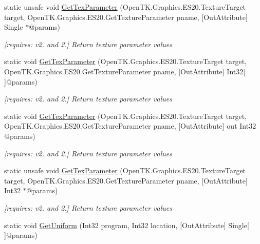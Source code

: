 \begin{DoxyCompactItemize}
static unsafe void \hyperlink{class_open_t_k_1_1_graphics_1_1_e_s20_1_1_g_l_a5606fb0cbe39b61b42330389179db6d7}{Get\-Tex\-Parameter} (Open\-T\-K.\-Graphics.\-E\-S20.\-Texture\-Target target, Open\-T\-K.\-Graphics.\-E\-S20.\-Get\-Texture\-Parameter pname, \mbox{[}Out\-Attribute\mbox{]} Single $\ast$@params)
\begin{DoxyCompactList}\small\item\em \mbox{[}requires\-: v2. and 2.\mbox{]} Return texture parameter values \end{DoxyCompactList}\item 
static void \hyperlink{class_open_t_k_1_1_graphics_1_1_e_s20_1_1_g_l_afcbdca751f2e40ee0025104967a636ea}{Get\-Tex\-Parameter} (Open\-T\-K.\-Graphics.\-E\-S20.\-Texture\-Target target, Open\-T\-K.\-Graphics.\-E\-S20.\-Get\-Texture\-Parameter pname, \mbox{[}Out\-Attribute\mbox{]} Int32\mbox{[}$\,$\mbox{]}@params)
\begin{DoxyCompactList}\small\item\em \mbox{[}requires\-: v2. and 2.\mbox{]} Return texture parameter values \end{DoxyCompactList}\item 
static void \hyperlink{class_open_t_k_1_1_graphics_1_1_e_s20_1_1_g_l_a906a2cf160b49867e188be1975690f97}{Get\-Tex\-Parameter} (Open\-T\-K.\-Graphics.\-E\-S20.\-Texture\-Target target, Open\-T\-K.\-Graphics.\-E\-S20.\-Get\-Texture\-Parameter pname, \mbox{[}Out\-Attribute\mbox{]} out Int32 @params)
\begin{DoxyCompactList}\small\item\em \mbox{[}requires\-: v2. and 2.\mbox{]} Return texture parameter values \end{DoxyCompactList}\item 
static unsafe void \hyperlink{class_open_t_k_1_1_graphics_1_1_e_s20_1_1_g_l_a98cb47383f5dbeb82656b040970ad398}{Get\-Tex\-Parameter} (Open\-T\-K.\-Graphics.\-E\-S20.\-Texture\-Target target, Open\-T\-K.\-Graphics.\-E\-S20.\-Get\-Texture\-Parameter pname, \mbox{[}Out\-Attribute\mbox{]} Int32 $\ast$@params)
\begin{DoxyCompactList}\small\item\em \mbox{[}requires\-: v2. and 2.\mbox{]} Return texture parameter values \end{DoxyCompactList}\item 
static void \hyperlink{class_open_t_k_1_1_graphics_1_1_e_s20_1_1_g_l_a6f70a32f31d8665fcab76056af81f943}{Get\-Uniform} (Int32 program, Int32 location, \mbox{[}Out\-Attribute\mbox{]} Single\mbox{[}$\,$\mbox{]}@params)

\end{DoxyCompactItemize}
